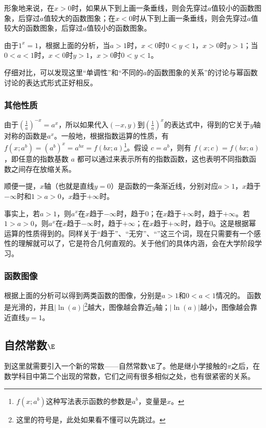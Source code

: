 形象地来说，在$x>0$时，如果从下到上画一条垂线，则会先穿过$a$值较小的函数图象，后穿过$a$值较大的函数图象；在$x<0$时从下到上画一条垂线，则会先穿过$a$值较大的函数图象，后穿过$a$值较小的函数图象。

由于$1^x=1$，根据上面的分析，当$a>1$时，$x<0$时$0<y<1$，$x>0$时$y>1$；当$0<a<1$时，$x<0$时$y>1$，$x>0$时$0<y<1$。

仔细对比，可以发现这里“单调性”和“不同的$a$的函数图象的关系”的讨论与幂函数讨论的表达式形式正好相反。

\subsubsection{其他性质}

由于$\displaystyle \left(\frac{1}{a}\right)^{-x}=a^{x}$，所以如果代入$(-x,y)$到$\displaystyle\left(\frac{1}{a}\right)^{x}$的表达式中，得到的它关于$y$轴对称的函数是$a^{x}$。一般地，根据指数运算的性质，有$f(x;a^b)=\left(a^b\right)^x=a^{bx}=f(bx;a)$\footnote{$f(x;a^b)$这种写法表示函数的参数是$a^b$，变量是$x$。}。假设 $c = a^b$，则有 $f(x; c) = f(bx; a)$，即任意的指数基数 $a$ 都可以通过来表示所有的指数函数，这也表明不同指数函数之间存在放缩关系。

顺便一提，$x$轴（也就是直线$y=0$）是函数的一条渐近线，分别对应$a>1$，$x$趋于$-\infty$时和$1>a>0$，$x$趋于$+\infty$时。

事实上，若$a>1$，则$a^x$在$x$趋于$-\infty$时，趋于$0$；在$x$趋于$+\infty$时，趋于$+\infty$。若$1>a>0$，则$a^x$在$x$趋于$-\infty$时，趋于$+\infty$；在$x$趋于$+\infty$时，趋于$0$。这是根据幂运算的性质得到的。同样关于“趋于”、“无穷”、“”这三个词，现在只需要有一个感性的理解就可以了，它是符合几何直观的。关于他们的具体内涵，会在大学阶段学习。

\subsubsection{函数图像}

根据上面的分析可以得到两类函数的图像，分别是$a>1$和$0<a<1$情况的。
函数是光滑的，并且$|\ln(a)|$\footnote{这里的符号是，此处如果看不懂可以先跳过。}越大，图像越会靠近$y$轴；$|\ln(a)|$越小，图像越会靠近直线$y=1$。

\subsection{自然常数$\E$}

到这里就需要引入一个新的常数——自然常数$\E$了。他是继小学接触的$\pi$之后，在数学科目中第二个出现的常数，它们之间有很多相似之处，也有很紧密的关系。

